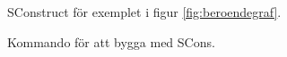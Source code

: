 \begin{figure}[h!]
  
  \caption{SConstruct för exemplet i figur \ref{fig:beroendegraf}.}
  \label{fig:sconstruct}
\end{figure}

\begin{figure}[h!]
  
  \caption{Kommando för att bygga med SCons.}
  \label{fig:sconskommando}
\end{figure}
